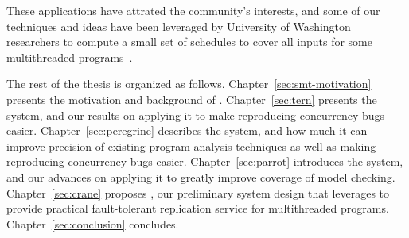These \smt applications have attrated the community's interests, and
some of our \smt techniques and ideas have been leveraged by University of
Washington researchers to compute a small set of schedules to cover all inputs
for some multithreaded programs~\cite{bergan:oopsla13}.

The rest of the thesis is organized as follows. Chapter~\ref{sec:smt-motivation}
presents the motivation and background of \smt. Chapter~\ref{sec:tern} presents
the \tern system, and our results on applying it to make reproducing concurrency
bugs easier. Chapter~\ref{sec:peregrine} describes the \peregrine system, and
how much it can improve precision of existing program analysis techniques as
well as making reproducing concurrency bugs easier. Chapter~\ref{sec:parrot}
introduces the \parrot system, and our advances on applying it to greatly
improve coverage of model checking. Chapter~\ref{sec:crane} proposes \crane, our
preliminary system design that leverages \smt to provide practical
fault-tolerant replication service for multithreaded programs.
Chapter~\ref{sec:conclusion} concludes.



